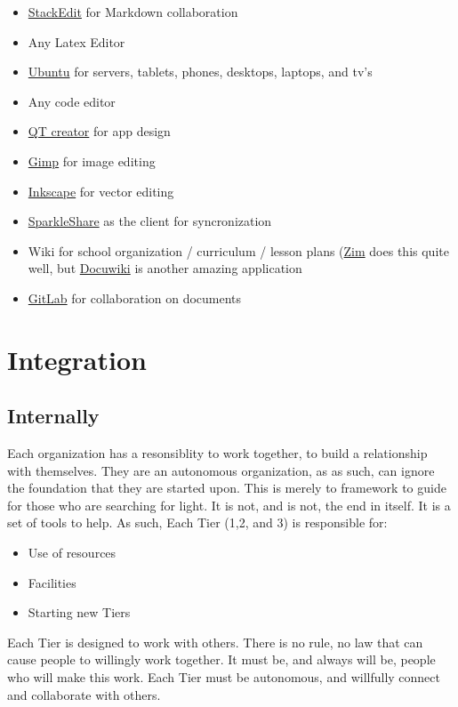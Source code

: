 \documentclass[CSHFoundation.tex]{subfiles}
\begin{document}
\begin{itemize}
\item \href{https://stackedit.io/}{StackEdit} for Markdown collaboration
\item Any Latex Editor
\item \href{http://www.ubuntu.com/}{Ubuntu} for servers, tablets, phones, desktops, laptops, and tv's
\item Any code editor
\item \href{http://qt-project.org/}{QT creator} for app design
\item \href{http://www.gimp.org/}{Gimp} for image editing
\item \href{http://www.inkscape.org/en/}{Inkscape} for vector editing
\item \href{./SparkleShare.tex}{SparkleShare} as the client for syncronization
\item Wiki for school organization / curriculum / lesson plans (\href{http://zim-wiki.org/manual/Help/Templates.html}{Zim} does this quite well, but \href{https://www.dokuwiki.org/dokuwiki}{Docuwiki} is another amazing application
\item \href{https://www.gitlab.com/}{GitLab} for collaboration on documents 
\end{itemize}

\section{Integration}
\subsection{Internally}

Each organization has a resonsiblity to work together, to build a relationship with themselves. They are an autonomous organization, as as such, can ignore the foundation that they are started upon. This is merely to framework to guide for those who are searching for light. It is not, and is not, the end in itself. It is a set of tools to help. As such, Each Tier (1,2, and 3) is responsible for:
\begin{itemize}
\item Use of resources
\item Facilities
\item Starting new Tiers
\end{itemize}

Each Tier is designed to work with others. There is no rule, no law that can cause people to willingly work together. It must be, and always will be, people who will make this work. Each Tier must be autonomous, and willfully connect and collaborate with others.
\end{document}
